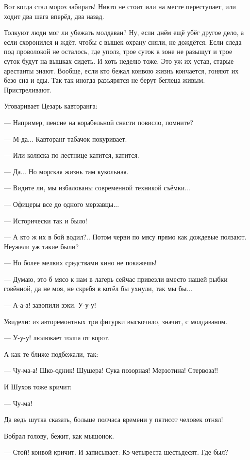 Вот когда стал мороз забирать! Никто не стоит \dash или на месте переступает, или ходит два шага
вперёд, два назад.

Толкуют люди \dash мог ли убежать молдаван? Ну, если днём ещё убёг \dash другое дело, а если
схоронился и ждёт, чтобы с вышек охрану сняли, не дождётся. Если следа под проволокой не
осталось, где уполз, \dash трое суток в зоне не разыщут и трое суток будут на вышках сидеть. И
хоть неделю \dash тоже. Это уж их устав, старые арестанты знают. Вообще, если кто бежал \dash конвою
жизнь кончается, гоняют их безо сна и еды. Так так иногда разъярятся \dash не берут беглеца
живым. Пристреливают.

Уговаривает Цезарь кавторанга:

--- Например, пенсне на корабельной снасти повисло, помните?

--- М-да... \dash Кавторанг табачок покуривает.

--- Или коляска по лестнице \dash катится, катится.

--- Да... Но морская жизнь там кукольная.

--- Видите ли, мы избалованы современной техникой съёмки...

--- Офицеры все до одного мерзавцы...

--- Исторически так и было!

--- А кто ж их в бой водил?.. Потом черви по мясу прямо как дождевые ползают. Неужели уж такие
были?

--- Но более мелких средствами кино не покажешь!

--- Думаю, это б мясо к нам в лагерь сейчас привезли вместо нашей рыбки говённой, да не моя, не
скребя в котёл бы ухнули, так мы бы...

--- А-а-а! \dash завопили зэки. \Dash У-у-у!

Увидели: из авторемонтных три фигурки выскочило, \dash значит, с молдаваном.

--- У-у-у! \dash люлюкает толпа от ворот.

А как те ближе подбежали, так:

--- Чу-ма-а! Шко-одник! Шушера! Сука позорная! Мерзотина! Стервоза!!

И Шухов тоже кричит:

--- Чу-ма!

Да ведь шутка сказать, больше полчаса времени у пятисот человек отнял!

Вобрал голову, бежит, как мышонок.

--- Стой! \dash конвой кричит. И записывает: \Dash Кэ-четыреста шестьдесят. Где был?

